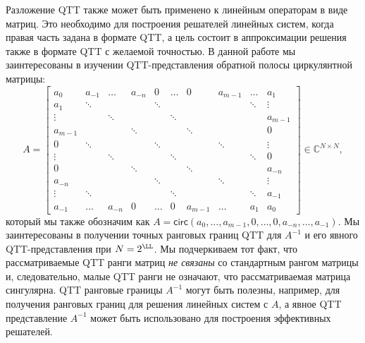 Разложение QTT также может быть применено к линейным операторам в виде матриц.
Это необходимо для построения решателей линейных систем, когда правая часть задана в формате QTT, а цель состоит в аппроксимации решения также в формате QTT с желаемой точностью.
В данной работе мы заинтересованы в изучении QTT-представления обратной полосы циркулянтной матрицы:
\begin{equation}\label{eq:A}
A=
\begin{bmatrix}
a_0     & a_{-1} & \dots  & a_{-n} & 0      & \dots  & 0       & a_{m-1} & \dots  & a_1     \\
a_1     & \ddots &        &        & \ddots &        &         &         & \ddots & \vdots  \\
\vdots  &        & \ddots &        &        & \ddots &         &         &        & a_{m-1} \\
a_{m-1} &        &        & \ddots &        &        & \ddots  &         &        & 0       \\
0       & \ddots &        &        & \ddots &        &         & \ddots  &        & \vdots  \\
\vdots  &        & \ddots &        &        & \ddots &         &         & \ddots & 0       \\
0       &        &        & \ddots &        &        & \ddots  &         &        & a_{-n}  \\
a_{-n}  &        &        &        & \ddots &        &         & \ddots  &        & \vdots  \\
\vdots  & \ddots &        &        &        & \ddots &         &         & \ddots & a_{-1}  \\
a_{-1}  & \dots  & a_{-n} & 0      & \dots  & 0      & a_{m-1} & \dots   & a_1    & a_0    
\end{bmatrix}\in\mathbb{C}^{N\times N},
\end{equation}
который мы также обозначим как $A = \mathsf{circ}(a_0,\dots, a_{m-1}, 0,\dots, 0, a_{-n},\dots, a_{-1})$.
Мы заинтересованы в получении точных ранговых границ QTT для $A^{-1}$ и его явного QTT-представления при $N = 2^\LL$.
Мы подчеркиваем тот факт, что рассматриваемые QTT ранги матриц \emph{не связаны} со стандартным рангом матрицы и, следовательно, малые QTT ранги не означают, что рассматриваемая матрица сингулярна.
QTT ранговые границы $A^{-1}$ могут быть полезны, например, для получения ранговых границ для решения линейных систем с $A$, а явное QTT представление $A^{-1}$ может быть использовано для построения эффективных решателей.

